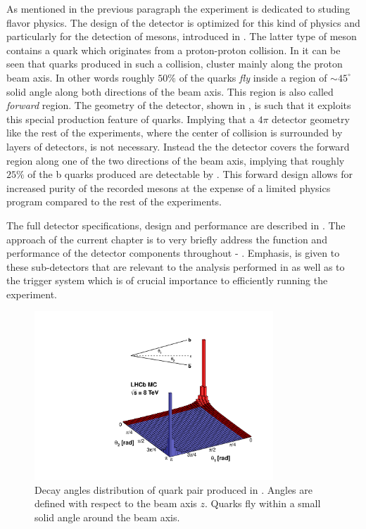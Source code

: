 As mentioned in the previous paragraph the \lhcb experiment is dedicated to studing flavor physics.
The design of the detector is optimized for this kind of physics and particularly for the detection
of \B mesons, introduced in . The latter type of meson contains a \bquark quark
which originates from a proton-proton collision. In  it can be seen
that \bquark quarks produced in such a collision, cluster mainly along the proton beam axis. In other words
roughly $50\%$ of the \bquark quarks {\it fly} inside a region of $\sim 45^\circ$ solid angle along both
directions of the beam axis. This region is also called {\it forward} region. The geometry of the \lhcb detector,
shown in , is such that it exploits this special production feature of \bquark quarks. Implying that
a $4\pi$ detector geometry like the rest of the \lhc experiments, where the center of collision is surrounded
by layers of detectors, is not necessary. Instead the the \lhcb detector covers the forward region along one
of the two directions of the beam axis, implying that roughly $25\%$ of the b quarks produced are detectable
by \lhcb. This forward design allows for increased purity of the recorded \B mesons at the expense of a limited
physics program compared to the rest of the \lhcb experiments.

The full \lhcb detector specifications, design and performance are described in \cite{Aaij:2014jba}.
The approach of the current chapter is to very briefly address the function and performance of the detector components
throughout  - . Emphasis, is given to these sub-detectors that are relevant
to the analysis performed in  as well as to the trigger system which is of crucial importance
to efficiently running the \lhcb experiment.

\begin{figure}[t]
  \centering
  \includegraphics[width=0.8\textwidth, trim=0cm 0cm 0cm 2.5cm, clip=true]{Figures/Chapter2/08_rad_acc_scheme_right}
  \caption{Decay angles distribution of \bquark quark pair produced in \lhcb. Angles are defined with
           respect to the beam axis $z$. Quarks fly within a small solid angle around the beam axis.}
  \label{bb_roduction_angles}
\end{figure}
